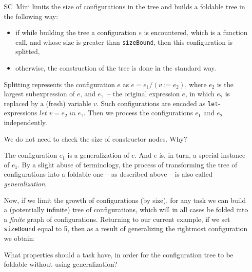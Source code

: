 SC~Mini limits the size of configurations in the tree and builds a foldable tree in the following way:
\begin{itemize}
\item if while building the tree a configuration $e$ is encountered,
which is a function call, and whose size is greater than \texttt{sizeBound}, then
this configuration is splitted,
\item otherwise, the construction of the tree is done in the standard way.
\end{itemize}

Splitting represents the configuration $e$ as $e = e_1 / (v := e_2)$,
where $e_2$ is the largest subexpression of $e$, and $e_1$~--
the original expression $e$, in which $e_2$ is replaced by a (fresh) variable $v$.
Such configurations are encoded as \texttt{let}-expressions $let\;v = e_2 \;in \;e_1$.
Then we process the configurations $e_1$ and $e_2$ independently.

\begin{exercise}
We do not need to check the size of constructor nodes. Why?
\end{exercise}

The configuration $e_1$ is a generalization of $e$. 
And $e$ is, in turn, a special instance of $e_1$.
By a slight abuse of terminology, the process of transforming the
tree of configurations into a foldable one -- as described above --
is also called \emph{generalization}.

Now, if we limit the growth of configurations (by size),
for any task we can build a (potentially infinite) tree of configurations,
which will in all cases be folded into a \emph{finite} graph of configurations.
Returning to our current example, if we set \texttt{sizeBound} equal to 5, then as
a result of generalizing the rightmost configuration we obtain:\\


\begin{exercise} 
What properties should a task have, in order for the configuration
tree to be foldable without using generalization?
\end{exercise}

